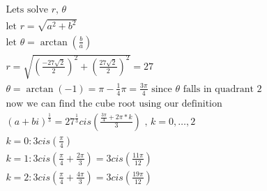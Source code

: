 \begin{equation}
    \begin{split}
        \text{Lets solve $r$, $\theta$} \\
        \text{let $r=\sqrt{a^2+b^2}$} \\
        \text{let $\theta=\arctan\left(\frac{b}{a}\right)$} \\
        r = \sqrt{(\frac{-27\sqrt{2}}{2})^2+(\frac{27\sqrt{2}}{2})^2} = 27\\
        \theta = \arctan(-1) = \pi-\frac{1}{4}\pi = \frac{3\pi}{4} \text{ since $\theta$ falls in quadrant 2} \\
        \text{now we can find the cube root using our definition} \\        
        (a+bi)^{\frac{1}{3}}= 27^{\frac{1}{3}}cis{(\frac{\frac{3\pi}{4}+2\pi*k}{3})} \text{ , } k=0,\ldots,2 \\
        k=0 : 3cis{(\frac{\pi}{4})} \\
        k=1 : 3cis{(\frac{\pi}{4}+\frac{2\pi}{3})} = 3cis{(\frac{11\pi}{12})} \\
        k=2 : 3cis{(\frac{\pi}{4}+\frac{4\pi}{3})} = 3cis{(\frac{19\pi}{12})} \\        
    \end{split}
\end{equation}